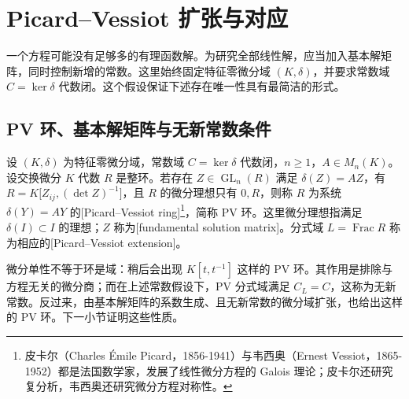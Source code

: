 %
%
\section{Picard–Vessiot 扩张与对应}
\label{b5:sec:E02}

一个方程可能没有足够多的有理函数解。为研究全部线性解，应当加入基本解矩阵，同时控制新增的常数。这里始终固定特征零微分域 \((K,\delta)\)，并要求常数域 \(C=\ker\delta\) 代数闭。这个假设保证下述存在唯一性具有最简洁的形式。

\subsection{PV 环、基本解矩阵与无新常数条件}
\label{b5:subsec:E02:01}

\begin{definition}\label{b5:def:E-pv-ring}
	设 \((K,\delta)\) 为特征零微分域，常数域 \(C=\ker\delta\) 代数闭，\(n\ge1\)，\(A\in M_n(K)\)。设交换微分 \(K\) 代数 \(R\) 是整环。若存在 \(Z\in\operatorname{GL}_n(R)\) 满足 \(\delta(Z)=AZ\)，有 \(R=K\bigl[Z_{ij},(\det Z)^{-1}\bigr]\)，且 \(R\) 的微分理想只有 \(0,R\)，则称 \(R\) 为系统 \(\delta(Y)=AY\) 的[Picard--Vessiot ring]\footnote{皮卡尔（Charles Émile Picard，1856-1941）与韦西奥（Ernest Vessiot，1865-1952）都是法国数学家，发展了线性微分方程的 Galois 理论；皮卡尔还研究复分析，韦西奥还研究微分方程对称性。}，简称 PV 环。这里微分理想指满足 \(\delta(I)\subset I\) 的理想；\(Z\) 称为[fundamental solution matrix]。分式域 \(L=\operatorname{Frac}R\) 称为相应的[Picard--Vessiot extension]。
\end{definition}

微分单性不等于环是域：稍后会出现 \(K[t,t^{-1}]\) 这样的 PV 环。其作用是排除与方程无关的微分商；而在上述常数假设下，PV 分式域满足 \(C_L=C\)，这称为无新常数。反过来，由基本解矩阵的系数生成、且无新常数的微分域扩张，也给出这样的 PV 环。下一小节证明这些性质。


